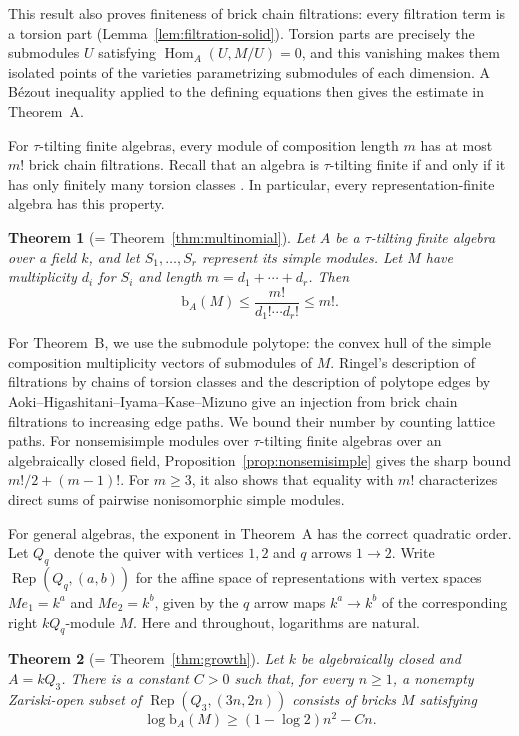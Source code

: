 \documentclass[a4paper,reqno,10pt]{amsart}
\newtheorem{theoremi}{Theorem}
\theoremstyle{definition}
\numberwithin{equation}{section}
\newcommand{\Hom}{\operatorname{Hom}}
\newcommand{\Rep}{\operatorname{Rep}}
\newcommand{\bcount}{\mathrm b}
\begin{document}
This result also proves finiteness of brick chain filtrations:
every filtration term is a torsion part
(Lemma~\ref{lem:filtration-solid}). Torsion parts are precisely the
submodules $U$ satisfying $\Hom_A(U,M/U)=0$, and this vanishing makes
them isolated points of the varieties parametrizing submodules of
each dimension. A B\'ezout inequality applied to the defining equations
then gives the estimate in Theorem~A.

For $\tau$-tilting finite algebras, every module of composition length $m$
has at most $m!$ brick chain filtrations.
Recall that an algebra is $\tau$-tilting finite if and only if it has
only finitely many torsion classes
\cite[Corollary~2.9(4) and Theorem~3.8]{DIJ}.
In particular, every representation-finite algebra has this property.

\begin{theoremi}[= Theorem~\ref{thm:multinomial}]
Let $A$ be a $\tau$-tilting finite algebra over a field $k$, and let
$S_1,\ldots,S_r$ represent its simple modules. Let $M$ have multiplicity
$d_i$ for $S_i$ and length $m=d_1+\cdots+d_r$. Then
\[
 \bcount_A(M)\leq\frac{m!}{d_1!\cdots d_r!}\leq m!.
\]
\end{theoremi}

For Theorem~B, we use the submodule polytope: the convex hull of the
simple composition multiplicity vectors of submodules of $M$.
Ringel's description of filtrations by chains of torsion classes and
the description of polytope edges by
Aoki--Higashitani--Iyama--Kase--Mizuno give an injection from brick
chain filtrations to increasing edge paths. We bound their number
by counting lattice paths. For nonsemisimple modules over
$\tau$-tilting finite algebras over an algebraically closed field,
Proposition~\ref{prop:nonsemisimple} gives the sharp bound
$m!/2+(m-1)!$. For $m\geq3$, it also shows that equality with $m!$
characterizes direct sums of pairwise nonisomorphic simple modules.

For general algebras, the exponent in Theorem~A has the correct
quadratic order. Let $Q_q$
denote the quiver with vertices $1,2$ and $q$ arrows $1\to2$.
Write $\Rep(Q_q,(a,b))$ for the affine space of representations with
vertex spaces $Me_1=k^a$ and $Me_2=k^b$, given by the $q$ arrow
maps $k^a\to k^b$ of the corresponding right $kQ_q$-module $M$.
Here and throughout, logarithms are natural.

\begin{theoremi}[= Theorem~\ref{thm:growth}]
Let $k$ be algebraically closed and $A=kQ_3$. There is a constant
$C>0$ such that, for every $n\geq1$,
a nonempty Zariski-open subset of $\Rep(Q_3,(3n,2n))$ consists of bricks
$M$ satisfying
\[
 \log\bcount_A(M)\geq (1-\log 2)n^2-Cn.
\]
\end{theoremi}
\end{document}
